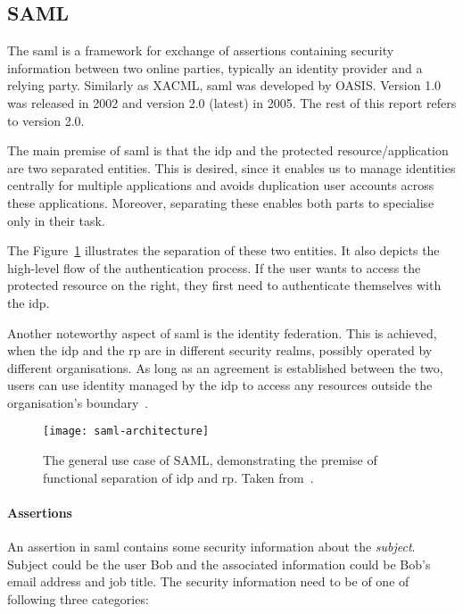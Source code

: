 \subsection{SAML}\label{sec:saml}

The \acrfull{saml} is a framework for exchange of assertions containing security information between two online parties, typically an identity provider and a relying party. Similarly as XACML, \acrshort{saml} was developed by OASIS. Version 1.0 was released in 2002 and version 2.0 (latest) in 2005. The rest of this report refers to version 2.0.

The main premise of \acrshort{saml} is that the \acrfull{idp} and the protected resource/application are two separated entities. This is desired, since it enables us to manage identities centrally for multiple applications and avoids duplication user accounts across these applications. Moreover, separating these enables both parts to specialise only in their task.

The Figure~\ref{fig:saml-architectire} illustrates the separation of these two entities. It also depicts the high-level flow of the authentication process. If the user wants to access the protected resource on the right, they first need to authenticate themselves with the \acrshort{idp}.

Another noteworthy aspect of \acrshort{saml} is the identity federation. This is achieved, when the \acrshort{idp} and the \acrshort{rp} are in different security realms, possibly operated by different organisations. As long as an agreement is established between the two, users can use identity managed by the \acrshort{idp} to access any resources outside the organisation's boundary~\cite{2008SecurityOverview}.

 \begin{figure}[ht]
    \centering
    \texttt{[image: saml-architecture]}
    \caption{The general use case of SAML, demonstrating the premise of functional separation of \acrshort{idp} and \acrshort{rp}. Taken from~\cite{2008SecurityOverview}.}
    \label{fig:saml-architectire}
\end{figure}

\paragraph{Assertions}
An assertion in \acrshort{saml} contains some security information about the \textit{subject}. Subject could be the user Bob and the associated information could be Bob's email address and job title. The security information need to be of one of following three categories:

